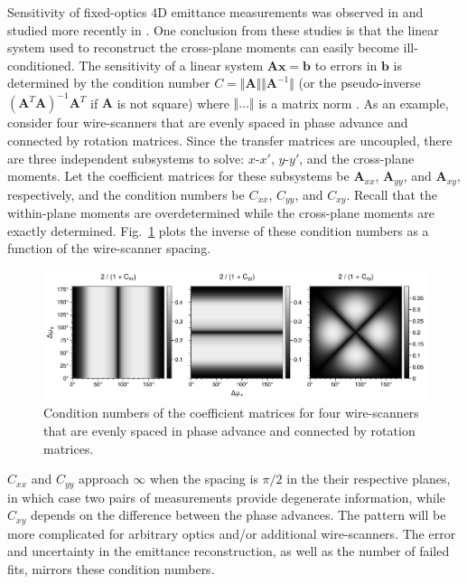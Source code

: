 Sensitivity of fixed-optics 4D emittance measurements was observed in \cite{Woodley2000} and studied more recently in \cite{Agapov2007, Faus-Golfe2016}. One conclusion from these studies is that the linear system used to reconstruct the cross-plane moments can easily become ill-conditioned. The sensitivity of a linear system $\mathbf{A} \mathbf{x} = \mathbf{b}$ to errors in $\mathbf{b}$ is determined by the condition number $C = \Vert \mathbf{A} \Vert \Vert \mathbf{A}^{-1} \Vert$ (or the pseudo-inverse $(\mathbf{A}^T\mathbf{A})^{-1} \mathbf{A}^T$ if $\mathbf{A}$ is not square) where $\Vert \dots \Vert$ is a matrix norm \cite{Golub1985}. As an example, consider four wire-scanners that are evenly spaced in phase advance and connected by rotation matrices. Since the transfer matrices are uncoupled, there are three independent subsystems to solve: $x$-$x'$, $y$-$y'$, and the cross-plane moments. Let the coefficient matrices for these subsystems be $\mathbf{A}_{xx}$, $\mathbf{A}_{yy}$, and $\mathbf{A}_{xy}$, respectively, and the condition numbers be $C_{xx}$, $C_{yy}$, and $C_{xy}$. Recall that the within-plane moments are overdetermined while the cross-plane moments are exactly determined. Fig.~\ref{fig:fodo_condition_number} plots the inverse of these condition numbers as a function of the wire-scanner spacing.
%
\begin{figure}[!p]
    \centering
    \includegraphics[width=\textwidth]{Images/chapter4/fodo_condition_number.png}
    \caption{Condition numbers of the coefficient matrices for four wire-scanners that are evenly spaced in phase advance and connected by rotation matrices.}
    \label{fig:fodo_condition_number}
\end{figure}
%
$C_{xx}$ and $C_{yy}$ approach $\infty$ when the spacing is $\pi/2$ in the their respective planes, in which case two pairs of measurements provide degenerate information, while $C_{xy}$ depends on the difference between the phase advances. The pattern will be more complicated for arbitrary optics and/or additional wire-scanners. The error and uncertainty in the emittance reconstruction, as well as the number of failed fits, mirrors these condition numbers. 

